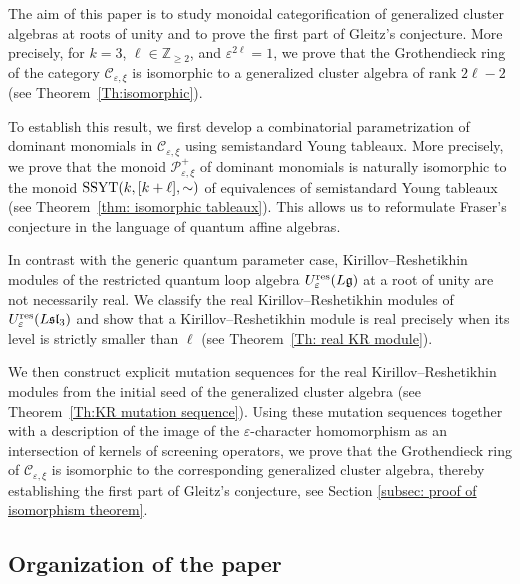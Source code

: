\documentclass[11pt, reqno]{amsart}
\theoremstyle{plain}
\theoremstyle{definition}
\numberwithin{equation}{section}
\newcommand{\SSYT}{{\rm SSYT}}
\newcommand{\res}{{\rm res}}
\begin{document}
The aim of this paper is to study monoidal categorification of generalized cluster algebras at roots of unity and to prove the first part of Gleitz's conjecture. More precisely, for $k=3$, $\ell\in \mathbb Z_{\ge2}$, and $\varepsilon^{2\ell}=1$, we prove that the Grothendieck ring of the category $\mathcal C_{\varepsilon,\xi}$ is isomorphic to a generalized cluster algebra of rank $2\ell-2$ (see Theorem~\ref{Th:isomorphic}).

To establish this result, we first develop a combinatorial parametrization of dominant monomials in $\mathcal C_{\varepsilon,\xi}$ using semistandard Young tableaux. More precisely, we prove that the monoid $\mathcal{P}^+_{\varepsilon, \xi}$ of dominant monomials is naturally isomorphic to the monoid $\SSYT(k, [k+\ell], \sim)$ of equivalences of semistandard Young tableaux (see Theorem~\ref{thm: isomorphic tableaux}). This allows us to reformulate Fraser's conjecture in the language of quantum affine algebras.

In contrast with the generic quantum parameter case, Kirillov--Reshetikhin modules of the restricted quantum loop algebra $U_\varepsilon^{\res}(L\mathfrak g)$ at a root of unity are not necessarily real. We classify the real Kirillov--Reshetikhin modules of $U_\varepsilon^{\res}(L\mathfrak{sl}_3)$ and show that a Kirillov--Reshetikhin module is real precisely when its level is strictly smaller than $\ell$ (see Theorem~\ref{Th: real KR module}).

We then construct explicit mutation sequences for the real Kirillov--Reshetikhin modules from the initial seed of the generalized cluster algebra (see Theorem~\ref{Th:KR mutation sequence}). Using these mutation sequences together with a description of the image of the $\varepsilon$-character homomorphism as an intersection of kernels of screening operators, we prove that the Grothendieck ring of $\mathcal C_{\varepsilon,\xi}$ is isomorphic to the corresponding generalized cluster algebra, thereby establishing the first part of Gleitz's conjecture, see Section \ref{subsec: proof of isomorphism theorem}.

\subsection{Organization of the paper}
\end{document}
